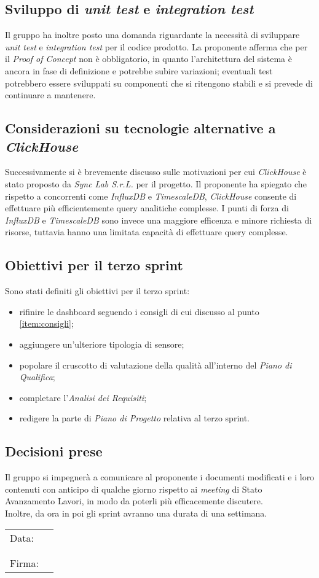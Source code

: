 \documentclass[italian,12pt]{article}
\begin{document}
\newpage
\subsection{Sviluppo di \textit{unit test} e \textit{integration test}}
Il gruppo ha inoltre posto una domanda riguardante la necessità di sviluppare \textit{unit test} e \textit{integration test} per il codice prodotto.
La proponente afferma che per il \textit{Proof of Concept} non è obbligatorio, in quanto l'architettura del sistema è ancora in fase di definizione
e potrebbe subire variazioni; eventuali test potrebbero essere sviluppati su componenti che si ritengono stabili e si prevede di continuare a mantenere.

\subsection{Considerazioni su tecnologie alternative a \textit{ClickHouse}}
Successivamente si è brevemente discusso sulle motivazioni per cui \textit{ClickHouse} è stato proposto da \textit{Sync Lab S.r.L.} per il progetto. Il proponente ha spiegato che
rispetto a concorrenti come \textit{InfluxDB} e \textit{TimescaleDB}, \textit{ClickHouse}
consente di effettuare più efficientemente query analitiche complesse.
I punti di forza di \textit{InfluxDB} e \textit{TimescaleDB} sono invece una maggiore efficenza e minore richiesta di risorse, tuttavia
hanno una limitata capacità di effettuare query complesse.

\subsection{Obiettivi per il terzo sprint}
Sono stati definiti gli obiettivi per il terzo sprint:
\begin{itemize}
	\item rifinire le dashboard seguendo i consigli di cui discusso al punto \ref{item:consigli};
	\item aggiungere un'ulteriore tipologia di sensore;
	\item popolare il cruscotto di valutazione della qualità all'interno del \textit{Piano di Qualifica};
	\item completare l'\textit{Analisi dei Requisiti};
	\item redigere la parte di \textit{Piano di Progetto} relativa al terzo sprint.
\end{itemize}

\subsection{Decisioni prese}
Il gruppo si impegnerà a comunicare al proponente i documenti modificati e i loro contenuti con anticipo di qualche giorno rispetto ai \textit{meeting}
di Stato Avanzamento Lavori, in modo da poterli più efficacemente discutere.\\
Inoltre, da ora in poi gli sprint avranno una durata di una settimana.

\newpage
\begin{table}[b]
	\begin{tabular}{@{}p{.5in}p{4in}@{}}
		Data:  & \hrulefill \\
		       &            \\
		       &            \\
		Firma: & \hrulefill \\
	\end{tabular}
\end{table}
\end{document}
